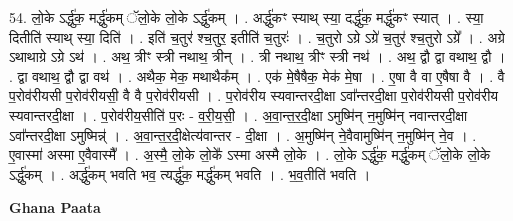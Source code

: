 \documentclass[17pt]{extarticle}
\begin{document}
54. लो॒के ऽर्द्धु॑क॒ मर्द्धु॑कम् ॅलो॒के लो॒के ऽर्द्धु॑कम् । . अर्द्धु॑कꣳ स्याथ् स्या॒ दर्द्धु॑क॒ मर्द्धु॑कꣳ स्यात् । . स्या॒ दितीति॑ स्याथ् स्या॒ दिति॑ । . इति॑ च॒तुर॑ श्च॒तुर॒ इतीति॑ च॒तुरः॑ । . च॒तुरो ऽग्रे ऽग्रे॑ च॒तुर॑ श्च॒तुरो ऽग्रे᳚ । . अग्रे ऽथाथाग्रे ऽग्रे ऽथ॑ । . अथ॒ त्रीꣳ स्त्री नथाथ॒ त्रीन् । . त्री नथाथ॒ त्रीꣳ स्त्री नथ॑ । . अथ॒ द्वौ द्वा वथाथ॒ द्वौ । . द्वा वथाथ॒ द्वौ द्वा वथ॑ । . अथैक॒ मेक॒ मथाथैक᳚म् । . एक॑ मे॒षैषैक॒ मेक॑ मे॒षा । . ए॒षा वै वा ए॒षैषा वै । . वै प॒रोव॑रीयसी प॒रोव॑रीयसी॒ वै वै प॒रोव॑रीयसी । . प॒रोव॑रीय स्यवान्तरदी॒क्षा ऽवा᳚न्तरदी॒क्षा प॒रोव॑रीयसी प॒रोव॑रीय स्यवान्तरदी॒क्षा । . प॒रोव॑रीय॒सीति॑ प॒रः - व॒री॒य॒सी॒ । . अ॒वा॒न्त॒र॒दी॒क्षा ऽमुष्मि॑न् न॒मुष्मि॑न् नवान्तरदी॒क्षा ऽवा᳚न्तरदी॒क्षा ऽमुष्मिन्न्॑ । . अ॒वा॒न्त॒र॒दी॒क्षेत्य॑वान्तर - दी॒क्षा । . अ॒मुष्मि॑न् ने॒वैवामुष्मि॑न् न॒मुष्मि॑न् ने॒व । . ए॒वास्मा॑ अस्मा ए॒वैवास्मै᳚ । . अ॒स्मै॒ लो॒के लो॒के᳚ ऽस्मा अस्मै लो॒के । . लो॒के ऽर्द्धु॑क॒ मर्द्धु॑कम् ॅलो॒के लो॒के ऽर्द्धु॑कम् । . अर्द्धु॑कम् भवति भव॒ त्यर्द्धु॑क॒ मर्द्धु॑कम् भवति । . भ॒व॒तीति॑ भवति । \newline

\textbf{Ghana Paata } \newline
\end{document}
